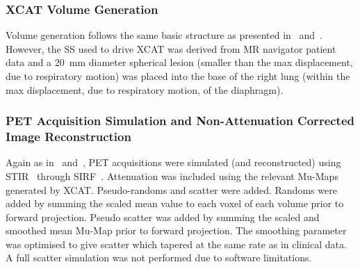             \subsubsection{XCAT Volume Generation} \label{sec:comparison_of_motion_correction_methods_incorporating_motion_modelling_for_pet_ct_using_a_single_breath_hold_attenuation_map_xcat_volume_generation}
                Volume generation follows the same basic structure as presented in~ and~. However, the \gls{SS} used to drive \gls{XCAT} was derived from \gls{MR} navigator patient data and a \SI{20}{\milli\metre} diameter spherical lesion (smaller than the max displacement, due to respiratory motion) was placed into the base of the right lung (within the max displacement, due to respiratory motion, of the diaphragm).
            
            \subsubsection{PET Acquisition Simulation and Non-Attenuation Corrected Image Reconstruction} \label{sec:comparison_of_motion_correction_methods_incorporating_motion_modelling_for_pet_ct_using_a_single_breath_hold_attenuation_map_pet_acquisition_simulation_and_non_attenuation_corrected_image_reconstruction}
                Again as in~ and~, \gls{PET} acquisitions were simulated (and reconstructed) using \gls{STIR}~\parencite{Thielemans2012, Nikos2019} through \gls{SIRF}~\parencite{Ovtchinnikov2017}. Attenuation was included using the relevant \glspl{Mu-Map} generated by \gls{XCAT}. Pseudo-randoms and scatter were added. Randoms were added by summing the scaled mean value to each voxel of each volume prior to forward projection. Pseudo scatter was added by summing the scaled and smoothed mean \gls{Mu-Map} prior to forward projection. The smoothing parameter was optimised to give scatter which tapered at the same rate as in clinical data. A full scatter simulation was not performed due to software limitations.
                
